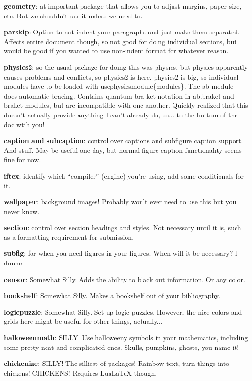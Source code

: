 \documentclass{article}
\begin{document}
\textbf{geometry}: at important package that allows you to adjust margins, paper size, etc. But we shouldn't use it unless we need to.

\textbf{parskip}: Option to not indent your paragraphs and just make them separated. Affects entire document though, so not good for doing individual sections, but would be good if you wanted to use non-indent format for whatever reason. 

\textbf{physics2}: so the usual package for doing this was physics, but physics apparently causes problems and conflicts, so physics2 is here. physics2 is big, so individual modules have to be loaded with usephysicsmodule\{modules\}. The ab module does automatic bracing. Contains quantum bra ket notation in ab.braket and braket modules, but are incompatible with one another. Quickly realized that this doesn't actually provide anything I can't already do, so... to the bottom of the doc wtih you!

\textbf{caption and subcaption}: control over captions and subfigure caption support. And stuff. May be useful one day, but normal figure caption functionality seems fine for now.

\textbf{iftex}: identify which ``compiler'' (engine) you're using, add some conditionals for it.

\textbf{wallpaper}: background images! Probably won't ever need to use this but you never know.

\textbf{section}: control over section headings and styles. Not necessary until it is, such as a formatting requirement for submission. 

\textbf{subfig}: for when you need figures in your figures. When will it be necessary? I dunno. 

\textbf{censor}: Somewhat Silly. Adds the ability to black out information. Or any color. 

\textbf{bookshelf}: Somewhat Silly. Makes a bookshelf out of your bibliography.

\textbf{logicpuzzle}: Somewhat Silly. Set up logic puzzles. However, the nice colors and grids here might be useful for other things, actually...

\textbf{halloweenmath}: SILLY! Use halloweeny symbols in your mathematics, including some pretty neat and complicated ones. Skulls, pumpkins, ghosts, you name it!

\textbf{chickenize}: SILLY! The silliest of packages! Rainbow text, turn things into chickens! CHICKENS! Requires LuaLaTeX though. 
\end{document}
